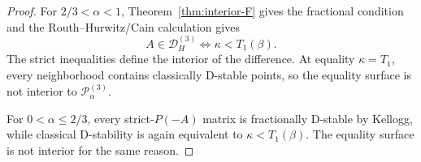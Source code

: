 \begin{proof}
For \(2/3<\alpha<1\), Theorem~\ref{thm:interior-F} gives the fractional condition and the Routh--Hurwitz/Cain calculation gives
\[
A\in\mathcal D_H^{(3)}
\iff
\kappa<T_1(\beta).
\]
The strict inequalities define the interior of the difference. At equality \(\kappa=T_1\), every neighborhood contains classically D-stable points, so the equality surface is not interior to \(\mathcal P_\alpha^{(3)}\).

For \(0<\alpha\le2/3\), every strict-\(P(-A)\) matrix is fractionally D-stable by Kellogg, while classical D-stability is again equivalent to \(\kappa<T_1(\beta)\). The equality surface is not interior for the same reason.
\end{proof}
